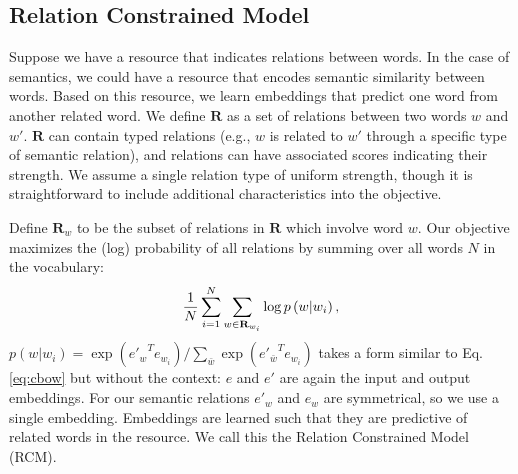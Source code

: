 \documentclass[11pt]{article}
\begin{document}
\subsection{Relation Constrained Model}
\label{ssec:train_rcm}
Suppose we have a resource that indicates relations between words.
In the case of semantics, we could have a resource that encodes semantic similarity between words.
Based on this resource, we learn embeddings that predict one word from another related word.
We define $\mathbf{R}$ as a set of relations between 
two words $w$ and $w'$. $\mathbf{R}$ can contain typed relations (e.g., $w$ is related to $w'$
through a specific type of semantic relation), and relations can have associated scores indicating
their strength. We assume a single relation type of uniform strength,
though it is straightforward to include additional characteristics into the objective.

Define $\mathbf{R}_w$ to be the subset of relations in $\mathbf{R}$ which involve word $w$. Our objective 
maximizes the (log) probability of all relations by summing over all words $N$ in the vocabulary:
\vspace{-.1cm}
\begin{equation}
\vspace{-.1cm}
\frac{1}{N} \sum_{i=1}^{N} \sum_{w \in \mathbf{R}_{w_i} } \log p\left( w | w_i \right),
\label{eq:pmm}
\end{equation}
$p(w|w_i) =  {\exp\left( {e'_{w}}^T e_{w_i} \right)}/ { \sum_{\bar{w}} \exp\left( {e'_{\bar{w}}}^T e_{w_i} \right)}$ takes a form similar to Eq. \eqref{eq:cbow} but without the context: 
$e$ and $e'$ are again the input and output embeddings. For our semantic relations
$e'_w$ and $e_w$ are symmetrical, so we use a single embedding.
Embeddings are learned such that they are predictive of related words in the resource.
We call this the Relation Constrained Model (RCM).
\end{document}
